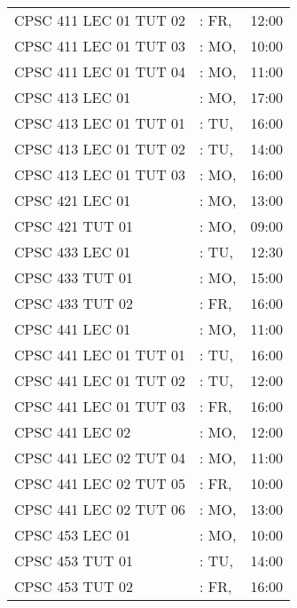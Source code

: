 \documentclass[11pt]{article}
\begin{document}
\begin{longtable}{l l r}
CPSC 411 LEC 01 TUT 02        &\hspace*{1.5cm}: FR,& 12:00\tabularnewline
CPSC 411 LEC 01 TUT 03        &\hspace*{1.5cm}: MO,& 10:00\tabularnewline
CPSC 411 LEC 01 TUT 04        &\hspace*{1.5cm}: MO,& 11:00\tabularnewline
CPSC 413 LEC 01               &\hspace*{1.5cm}: MO,& 17:00\tabularnewline
CPSC 413 LEC 01 TUT 01        &\hspace*{1.5cm}: TU,& 16:00\tabularnewline
CPSC 413 LEC 01 TUT 02        &\hspace*{1.5cm}: TU,& 14:00\tabularnewline
CPSC 413 LEC 01 TUT 03        &\hspace*{1.5cm}: MO,& 16:00\tabularnewline
CPSC 421 LEC 01               &\hspace*{1.5cm}: MO,& 13:00\tabularnewline
CPSC 421 TUT 01               &\hspace*{1.5cm}: MO,& 09:00\tabularnewline
CPSC 433 LEC 01               &\hspace*{1.5cm}: TU,& 12:30\tabularnewline
CPSC 433 TUT 01               &\hspace*{1.5cm}: MO,& 15:00\tabularnewline
CPSC 433 TUT 02               &\hspace*{1.5cm}: FR,& 16:00\tabularnewline
CPSC 441 LEC 01               &\hspace*{1.5cm}: MO,& 11:00\tabularnewline
CPSC 441 LEC 01 TUT 01        &\hspace*{1.5cm}: TU,& 16:00\tabularnewline
CPSC 441 LEC 01 TUT 02        &\hspace*{1.5cm}: TU,& 12:00\tabularnewline
CPSC 441 LEC 01 TUT 03        &\hspace*{1.5cm}: FR,& 16:00\tabularnewline
CPSC 441 LEC 02               &\hspace*{1.5cm}: MO,& 12:00\tabularnewline
CPSC 441 LEC 02 TUT 04        &\hspace*{1.5cm}: MO,& 11:00\tabularnewline
CPSC 441 LEC 02 TUT 05        &\hspace*{1.5cm}: FR,& 10:00\tabularnewline
CPSC 441 LEC 02 TUT 06        &\hspace*{1.5cm}: MO,& 13:00\tabularnewline
CPSC 453 LEC 01               &\hspace*{1.5cm}: MO,& 10:00\tabularnewline
CPSC 453 TUT 01               &\hspace*{1.5cm}: TU,& 14:00\tabularnewline
CPSC 453 TUT 02               &\hspace*{1.5cm}: FR,& 16:00\tabularnewline

\end{longtable}
\end{document}
